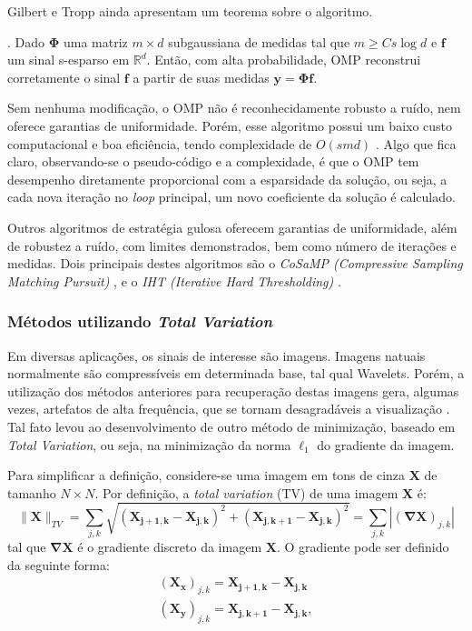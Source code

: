\documentclass[cic,tc]{iiufrgs}
\renewcommand{\vec}[1]{\bm{#1}}
\newcommand{\mat}[1]{\bm{#1}}
\begin{document}
Gilbert e Tropp ainda apresentam um teorema sobre o algoritmo.
\begin{teorema}
    \cite{GilbertOMP}.
    Dado $\mathbf{\Phi}$ uma matriz $m \times d$ subgaussiana de medidas tal que $m \ge C s \log{d}$ e
    $\vec{f}$ um sinal s-esparso em $\mathbb{R}^d$.
    Então, com alta probabilidade, OMP reconstrui corretamente o sinal $\vec{f}$ a partir de suas
    medidas $\vec{y} = \mathbf{\Phi}\vec{f}$.
\end{teorema}
Sem nenhuma modificação, o OMP não é reconhecidamente robusto a ruído, nem oferece garantias de uniformidade.
Porém, esse algoritmo possui um baixo custo computacional e boa eficiência, tendo complexidade de
$O(s m d)$ \cite{chen2015compressed}. 
Algo que fica claro, observando-se o pseudo-código e a complexidade, é que o OMP tem desempenho diretamente
proporcional com a esparsidade da solução, ou seja, a cada nova iteração no \textit{loop} principal, um 
novo coeficiente da solução é calculado.

Outros algoritmos de estratégia gulosa oferecem garantias de uniformidade, além de robustez a ruído, com 
limites demonstrados, bem como número de iterações e medidas. Dois principais destes algoritmos são o 
\textit{CoSaMP (Compressive Sampling Matching Pursuit)} \cite{NeedellCoSaMP}, e o 
\textit{IHT (Iterative Hard Thresholding)} \cite{BLUMENSATHIHT}.

\subsubsection{Métodos utilizando \textit{Total Variation}}
Em diversas aplicações, os sinais de interesse são imagens. Imagens natuais normalmente são compressíveis
em determinada base, tal qual Wavelets. Porém, a utilização dos métodos anteriores para recuperação 
destas imagens gera, algumas vezes, artefatos de alta frequência, que se tornam desagradáveis a
visualização \cite{chen2015compressed}.
Tal fato levou ao desenvolvimento de outro método de minimização, baseado em \textit{Total Variation},
ou seja, na minimização da norma $\ell_1$ do gradiente da imagem.

Para simplificar a definição, considere-se uma imagem em tons de cinza $\mat{X}$ de tamanho $N\times N$.
Por definição, a \textit{total variation} (TV) de uma imagem $\mat{X}$ é:
\begin{equation}
    \lVert \mat{X} \rVert_{TV} = \sum_{j,k}
    \sqrt{\left( \mat{X_{j+1,k}} - \mat{X_{j,k}} \right)^2 + \left( \mat{X_{j,k+1}} - \mat{X_{j,k}} \right)^2} = 
    \sum_{j,k} |\mat{(\nabla X)}_{j,k} |
\end{equation}
tal que $\mat{\nabla X}$ é o gradiente discreto da imagem $\mat{X}$. O gradiente pode ser definido da 
seguinte forma:
\begin{align*}
    \mat{(X_x)}_{j,k} = \mat{X_{j+1,k}} - \mat{X_{j,k}} \\
    \mat{(X_y)}_{j,k} = \mat{X_{j,k+1}} - \mat{X_{j,k}},
\end{align*}
\end{document}
